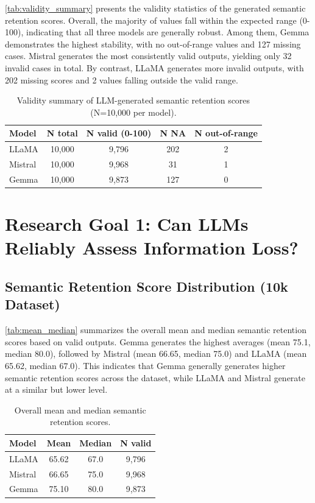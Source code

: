 \documentclass{DESSThesis}
\begin{document}
\autoref{tab:validity_summary} presents the validity statistics of the generated semantic retention scores. Overall, the majority of values fall within the expected range (0-100), indicating that all three models are generally robust. Among them, Gemma demonstrates the highest stability, with no out-of-range values and 127 missing cases. Mistral generates the most consistently valid outputs, yielding only 32 invalid cases in total. By contrast, LLaMA generates more invalid outputs, with 202 missing scores and 2 values falling outside the valid range.

\begin{table}[H]
\centering
\caption{Validity summary of LLM-generated semantic retention scores (N=10,000 per model).}
\label{tab:validity_summary}
\begin{tabular}{lcccc}
\toprule
Model & N total & N valid (0-100) & N NA & N out-of-range \\
\midrule
LLaMA   & 10,000 & 9,796 & 202 & 2 \\
Mistral & 10,000 & 9,968 & 31  & 1 \\
Gemma   & 10,000 & 9,873 & 127 & 0 \\
\bottomrule
\end{tabular}
\end{table}

\section{Research Goal 1: Can LLMs Reliably Assess Information Loss?}
\subsection{Semantic Retention Score Distribution (10k Dataset)}
\autoref{tab:mean_median} summarizes the overall mean and median semantic retention scores based on valid outputs. Gemma generates the highest averages (mean 75.1, median 80.0), followed by Mistral (mean 66.65, median 75.0) and LLaMA (mean 65.62, median 67.0). This indicates that Gemma generally generates higher semantic retention scores across the dataset, while LLaMA and Mistral generate at a similar but lower level.

\begin{table}[H]
\centering
\caption{Overall mean and median semantic retention scores.}
\label{tab:mean_median}
\begin{tabular}{lccc}
\toprule
Model & Mean & Median & N valid \\
\midrule
LLaMA   & 65.62 & 67.0 & 9,796 \\
Mistral & 66.65 & 75.0 & 9,968 \\
Gemma   & 75.10 & 80.0 & 9,873 \\
\bottomrule
\end{tabular}
\end{table}
\end{document}

